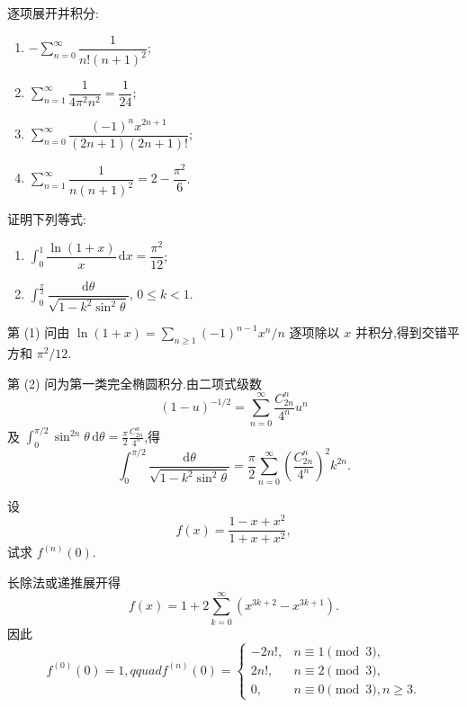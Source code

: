 \begin{solution}
    逐项展开并积分:
    \begin{enumerate}
        \item $\displaystyle-\sum\limits_{n=0}^{\infty}\dfrac{1}{n!(n+1)^2}$;
        \item $\displaystyle\sum\limits_{n=1}^{\infty}\dfrac{1}{4\pi^2n^2}=\dfrac{1}{24}$;
        \item $\displaystyle\sum\limits_{n=0}^{\infty}\dfrac{(-1)^nx^{2n+1}}{(2n+1)(2n+1)!}$;
        \item $\displaystyle\sum\limits_{n=1}^{\infty}\dfrac{1}{n(n+1)^2}=2-\dfrac{\pi^2}{6}$.
    \end{enumerate}
\end{solution}

\begin{example}
    证明下列等式:
    \begin{enumerate}
        \item $\displaystyle\int_0^1\dfrac{\ln(1+x)}{x}\,\mathrm{d}x=\dfrac{\pi^2}{12}$;
        \item $\displaystyle\int_0^{\frac{\pi}{2}}\dfrac{\mathrm{d}\theta}{\sqrt{1-k^2\sin^2\theta}}$, $0\leq k<1$.
    \end{enumerate}
\end{example}
\exampleblank

\begin{solution}
    第 (1) 问由 $\ln(1+x)=\displaystyle\sum_{n\geq1}(-1)^{n-1}x^n/n$ 逐项除以 $x$ 并积分,得到交错平方和 $\pi^2/12$.

    第 (2) 问为第一类完全椭圆积分.由二项式级数
    \[
        (1-u)^{-1/2}=\sum\limits_{n=0}^{\infty}\dfrac{C_{2n}^{n}}{4^n}u^n
    \]
    及 $\displaystyle\int_0^{\pi/2}\sin^{2n}\theta\,\mathrm{d}\theta
        =\frac{\pi}{2}\frac{C_{2n}^{n}}{4^n}$,得
    \[
        \displaystyle\int_0^{\pi/2}\dfrac{\mathrm{d}\theta}{\sqrt{1-k^2\sin^2\theta}}
        =\dfrac{\pi}{2}\sum\limits_{n=0}^{\infty}
        \left(\dfrac{C_{2n}^{n}}{4^n}\right)^2k^{2n}.
    \]
\end{solution}




\begin{example}
    设
    \[
        f(x)=\dfrac{1-x+x^2}{1+x+x^2},
    \]
    试求 $f^{(n)}(0)$.
\end{example}
\exampleblank

\begin{solution}
    长除法或递推展开得
    \[
        f(x)=1+2\sum\limits_{k=0}^{\infty}(x^{3k+2}-x^{3k+1}).
    \]
    因此
    \[
        f^{(0)}(0)=1,qquad
        f^{(n)}(0)=
        \begin{cases}
            -2n!, & n\equiv1\pmod3,         \\
            2n!,  & n\equiv2\pmod3,         \\
            0,    & n\equiv0\pmod3, n\geq3.
        \end{cases}
    \]
\end{solution}


